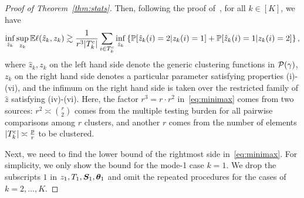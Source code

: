 \documentclass[lettersize,journal]{IEEEtran}
\theoremstyle{definition}
\theoremstyle{definition}
\begin{document}
\begin{proof}[Proof of Theorem~\ref{thm:stats}]
Then, following the proof of~\citet[Theorem 2]{gao2018community}, for all $k \in [K]$, we have
\begin{equation}\label{eq:minimax}
\inf_{\hat z_k}\sup_{z_k}\bbE \ell(\hat z_k, z_k) \gtrsim {1\over r^3 |T^c_k|}\sum_{i\in T^c_k}\inf_{\hat z_k}\left\{\bbP[\hat z_k(i)=2|z_k(i)=1] + \bbP[\hat z_k(i)=1|z_k(i)=2] \right\},
\end{equation}
where $\hat z_k, z_k$ on the left hand side denote the generic clustering functions in $\mathcal{P}(\gamma)$, $z_k$ on the right hand side denotes a particular parameter satisfying properties (i)-(vi), and the infimum on the right hand side is taken over the restricted family of $\hat z$ satisfying (iv)-(vi). Here, the factor $r^3=r\cdot r^2$ in~\eqref{eq:minimax} comes from two sources: $r^2\asymp {r\choose 2}$ comes from the multiple testing burden for all pairwise comparisons among $r$ clusters, and another $r$ comes from the number of elements $|T^c_k|\asymp {p\over r}$ to be clustered. 

Next, we need to find the lower bound of the rightmost side in~\eqref{eq:minimax}. For simplicity, we only show the bound for the mode-1 case $k = 1$. We drop the subscripts $1$ in $z_1, T_1, \bm S_1, \boldsymbol{\theta}_1$ and omit the repeated procedures for the cases of $k = 2,\ldots, K$. 


\end{proof}
\end{document}
